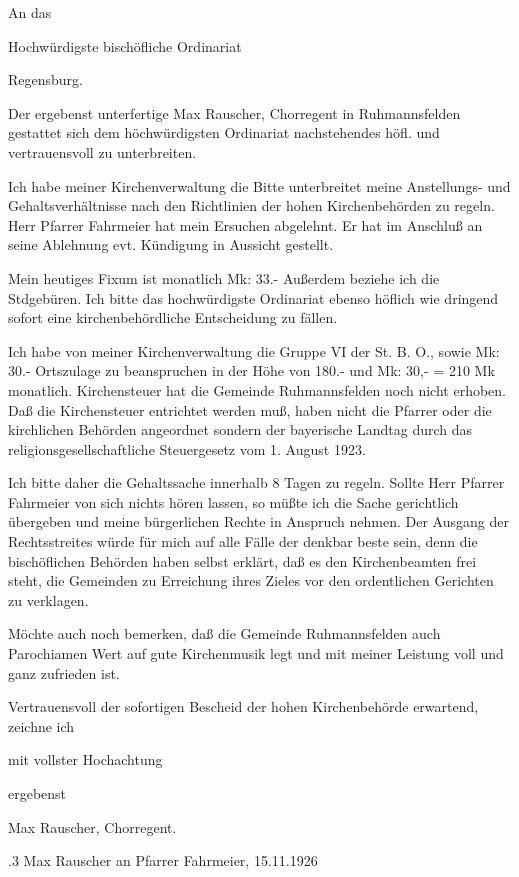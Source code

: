 \documentclass[12pt,a4pager]{book}
\begin{document}
An das

    Hochwürdigste bischöfliche Ordinariat

                    Regensburg.



Der ergebenst unterfertige Max Rauscher, Chorregent in Ruhmannsfelden gestattet
sich dem höchwürdigsten Ordinariat nachstehendes höfl. und vertrauensvoll zu
unterbreiten.

Ich habe meiner Kirchenverwaltung die Bitte unterbreitet meine Anstellungs- und
Gehaltsverhältnisse nach den Richtlinien der hohen Kirchenbehörden zu regeln.
Herr Pfarrer Fahrmeier hat mein Ersuchen abgelehnt. Er hat im Anschluß an seine
Ablehnung evt. Kündigung in Aussicht gestellt.

Mein heutiges Fixum ist monatlich Mk: 33.- Außerdem beziehe ich die Stdgebüren.
Ich bitte das hochwürdigste Ordinariat ebenso höflich wie dringend sofort eine
kirchenbehördliche Entscheidung zu fällen.

Ich habe von meiner Kirchenverwaltung die Gruppe VI der St. B. O., sowie Mk:
30.- Ortszulage zu beanspruchen in der Höhe von 180.- und Mk: 30,- = 210 Mk
monatlich. Kirchensteuer hat die Gemeinde Ruhmannsfelden noch nicht erhoben. Daß
die Kirchensteuer entrichtet werden muß, haben nicht die Pfarrer oder die
kirchlichen Behörden angeordnet sondern der bayerische Landtag durch das
religionsgesellschaftliche Steuergesetz vom 1. August 1923.

Ich bitte daher die Gehaltssache innerhalb 8 Tagen zu regeln. Sollte Herr
Pfarrer Fahrmeier von sich nichts hören lassen, so müßte ich die Sache
gerichtlich übergeben und meine bürgerlichen Rechte in Anspruch nehmen. Der
Ausgang der Rechtsstreites würde für mich auf alle Fälle der denkbar beste sein,
denn die bischöflichen Behörden haben selbst erklärt, daß es den Kirchenbeamten
frei steht, die Gemeinden zu Erreichung ihres Zieles vor den ordentlichen
Gerichten zu verklagen.

Möchte auch noch bemerken, daß die Gemeinde Ruhmannsfelden auch Parochiamen Wert
auf gute Kirchenmusik legt und mit meiner Leistung voll und ganz zufrieden ist.

Vertrauensvoll der sofortigen Bescheid der hohen Kirchenbehörde erwartend,
zeichne ich



mit vollster Hochachtung

ergebenst

Max Rauscher, Chorregent.

.3 Max Rauscher an Pfarrer Fahrmeier, 15.11.1926
\end{document}
